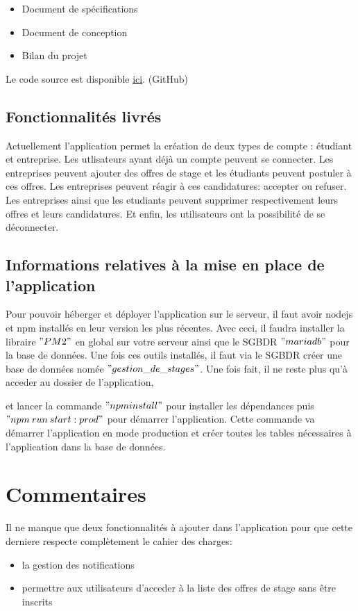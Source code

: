 \documentclass[a4paper, 12pt]{report}
\begin{document}
\begin{itemize}
    \item Document de spécifications
    \item Document de conception
    \item Bilan du projet
\end{itemize}


Le code source est disponible \href{https://github.com/BBIITS/Gestion_de_stages}{ici}. (GitHub)


\subsection*{Fonctionnalités livrés}

Actuellement l'application permet la création de deux types de compte : étudiant et entreprise. Les utlisateurs ayant déjà un compte
peuvent se connecter. Les entreprises peuvent ajouter des offres de stage et les étudiants peuvent postuler à ces offres. Les entreprises
peuvent réagir à ces candidatures: accepter ou refuser. Les entreprises ainsi que les etudiants peuvent supprimer respectivement leurs
offres et leurs candidatures. Et enfin, les utilisateurs ont la possibilité de se déconnecter.


\subsection*{Informations relatives à la mise en place de l'application}
Pour pouvoir héberger et déployer l'application sur le serveur, il faut avoir nodejs et npm installés en leur version les plus récentes.
Avec ceci, il faudra installer la libraire $"PM2"$ en global sur votre serveur ainsi que le SGBDR $"mariadb"$ pour la base de données. Une fois ces
outils installés, il faut via le SGBDR créer une base de données nomée $"gestion\_de\_stages"$.
Une fois fait, il ne reste plus qu'à acceder au dossier de l'application,

et lancer la commande $"npm install"$ pour installer les dépendances
puis $"npm \: run \: start:prod"$ pour démarrer l'application. Cette commande va démarrer l'application en mode production et créer toutes les tables
nécessaires à l'application dans la base de données.


\section*{Commentaires}

Il ne manque que deux fonctionnalités à ajouter dans l'application pour que cette derniere respecte complètement
le cahier des charges:
\begin{itemize}
    \item la gestion des notifications
    \item permettre aux utilisateurs d'acceder à la liste des offres de stage sans être inscrits
\end{itemize}
\end{document}

